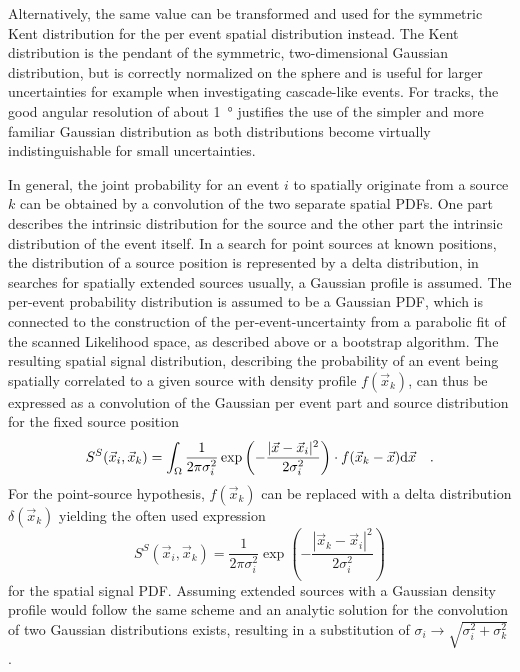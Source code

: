 Alternatively, the same value can be transformed and used for the symmetric Kent distribution \cite{Kent:1982pdf} for the per event spatial distribution instead.
The Kent distribution is the pendant of the symmetric, two-dimensional Gaussian distribution, but is correctly normalized on the sphere and is useful for larger uncertainties for example when investigating cascade-like events.
For tracks, the good angular resolution of about \SI{1}{\degree} justifies the use of the simpler and more familiar Gaussian distribution as both distributions become virtually indistinguishable for small uncertainties.

In general, the joint probability for an event $i$ to spatially originate from a source $k$ can be obtained by a convolution of the two separate spatial PDFs.
One part describes the intrinsic distribution for the source and the other part the intrinsic distribution of the event itself.
In a search for point sources at known positions, the distribution of a source position is represented by a delta distribution, in searches for spatially extended sources usually, a Gaussian profile is assumed.
The per-event probability distribution is assumed to be a Gaussian PDF, which is connected to the construction of the per-event-uncertainty from a parabolic fit of the scanned Likelihood space, as described above or a bootstrap algorithm.
The resulting spatial signal distribution, describing the probability of an event being spatially correlated to a given source with density profile $f(\vec{x}_k)$, can thus be expressed as a convolution of the Gaussian per event part and source distribution for the fixed source position
\begin{equation}
  \label{equ:spatial_pdf}
  S^S(\vec{x}_i, \vec{x}_k)
  = \int_\Omega \frac{1}{2\pi \sigma_i^2}
    \exp\left(-\frac{|\vec{x}-\vec{x}_i|^2}{2\sigma_i^2}\right) \cdot
    f(\vec{x}_k - \vec{x}) \mathrm{d}\vec{x} \\
    \quad\text{.}
\end{equation}
For the point-source hypothesis, $f(\vec{x}_k)$ can be replaced with a delta distribution $\delta(\vec{x}_k)$ yielding the often used expression
\begin{equation}
  S^S(\vec{x}_i, \vec{x}_k)
  = \frac{1}{2\pi \sigma_i^2}
    \exp\left(-\frac{|\vec{x}_k-\vec{x}_i|^2}
                    {2\sigma_i^2}\right)
\end{equation}
for the spatial signal PDF.
Assuming extended sources with a Gaussian density profile would follow the same scheme and an analytic solution for the convolution of two Gaussian distributions exists, resulting in a substitution of $\sigma_i \rightarrow \sqrt{\sigma_i^2 + \sigma_k^2}$ \cite{Bromiley2014ProductsAC}.

